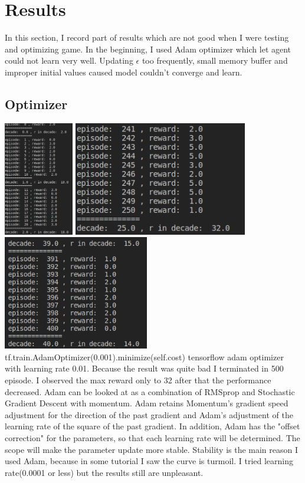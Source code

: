 \documentclass[a4paper, 11pt]{article}
\begin{document}
\section*{Results}
In this section, I record part of results which are not good when I were testing and optimizing game. In the beginning, I used Adam optimizer which let agent could not learn very well. Updating $\epsilon$ too frequently, small memory buffer and improper initial values caused model couldn't converge and learn.
\subsection*{Optimizer}
\includegraphics[height = 5cm]{adam1.png}
\includegraphics[height = 5cm]{adam3.png}
\includegraphics[height = 5cm]{adam2.png}\\
tf.train.AdamOptimizer(0.001).minimize(self.cost) tensorflow adam optimizer with learning rate 0.01. Because the result was quite bad I terminated in 500 episode. I observed the max reward only to 32 after that the performance decreased. Adam can be looked at as a combination of RMSprop and Stochastic Gradient Descent with momentum. Adam retains Momentum's gradient speed adjustment for the direction of the past gradient and Adam's adjustment of the learning rate of the square of the past gradient. In addition, Adam has the "offset correction" for the parameters, so that each learning rate will be determined. The scope will make the parameter update more stable. Stability is the main reason I used Adam, because in some tutorial I saw the curve is turmoil. I tried learning rate(0.0001 or less) but the results still are unpleasant. \\
\end{document}
